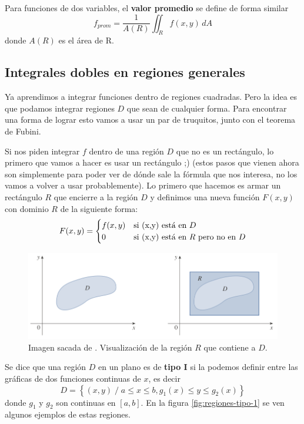 \documentclass[12pt]{article}
\begin{document}
Para funciones de dos variables, el \textbf{valor promedio} se define de forma similar
\[
  f_{prom}=\frac{1}{A(R)}\iint_{R} f(x,y) \,dA
\]
donde $ A(R) $ es el área de R.

\subsection{Integrales dobles en regiones generales}
Ya aprendimos a integrar funciones dentro de regiones cuadradas. Pero la idea es que podamos integrar regiones $ D $ que sean de cualquier forma. Para encontrar una forma de lograr esto vamos a usar un par de truquitos, junto con el teorema de Fubini. 

Si nos piden integrar $ f $ dentro de una región $ D $ que no es un rectángulo, lo primero que vamos a hacer es usar un rectángulo ;) (estos pasos que vienen ahora son simplemente para poder ver de dónde sale la fórmula que nos interesa, no los vamos a volver a usar probablemente). Lo primero que hacemos es armar un rectángulo $ R $ que encierre a la región $ D $ y definimos una nueva función $ F(x,y) $ con dominio $ R $ de la siguiente forma:
\[
  F(x,y)=
  \begin{cases}
  f(x,y) & \text{si (x,y) está en $ D $}\\
  0 & \text{si (x,y) está en $ R $ pero no en $ D $}
  \end{cases}
\]

\begin{figure}[H]
  \centering
  \includegraphics[width=\linewidth]{imagenes/integral-region-general.png}
  \caption{Imagen sacada de \parencite{stewart2}. Visualización de la región $ R $ que contiene a $ D $.}
  \label{fig:integral-region-general}
\end{figure}

Se dice que una región $ D $ en un plano es de \textbf{tipo I} si la podemos definir entre las gráficas de dos funciones continuas de $ x $, es decir
\[
  D=\left\{(x,y)  \;/\;  a\leq x\leq b, g_{1}(x)\leq y\leq g_{2}(x)\right\}
\]
donde $ g_{1} $ y $ g_{2} $ son continuas en $ \left[a,b\right] $. En la figura \ref{fig:regiones-tipo-1} se ven algunos ejemplos de estas regiones.
\end{document}
